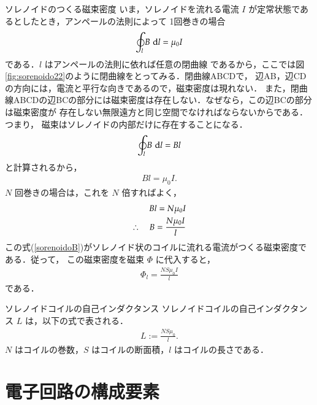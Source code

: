 \begin{memo}{ソレノイドのつくる磁束密度}
        いま，ソレノイドを流れる電流 $I$ が定常状態であるとしたとき，アンペールの法則によって
        1回巻きの場合
        \begin{align}
            \oint_{l}B\,\,\mathrm{d} l =\mu_{0}I
        \end{align}
        である．$l$ はアンペールの法則に依れば任意の閉曲線
        であるから，ここでは図\ref{fig:sorenoido22}のように閉曲線をとってみる．閉曲線ABCDで，
        辺AB，辺CDの方向には，電流と平行な向きであるので，磁束密度は現れない．
        また，閉曲線ABCDの辺BCの部分には磁束密度は存在しない．なぜなら，この辺BCの部分は磁束密度が
        存在しない無限遠方と同じ空間でなければならないからである．つまり，
        磁束はソレノイドの内部だけに存在することになる．
        \begin{equation*}
            \oint_{l}B\,\,\mathrm{d} l=Bl
        \end{equation*}
        と計算されるから，
        \begin{align}
            Bl=\mu_{0} I.
        \end{align}
        $N$ 回巻きの場合は，これを $N$ 倍すればよく，
        \begin{align}\label{sorenoidoB}
            Bl=N\mu_{0} I \\ \notag
            \therefore\quad B=\frac{N\mu_{0} I}{l}
        \end{align}
        この式(\ref{sorenoidoB})がソレノイド状のコイルに流れる電流がつくる磁束密度である．従って，
        この磁束密度を磁束 $\Phi$ に代入すると，
            \begin{align}
                \Phi_{l}=\frac{NS\mu_{0} I}{l}
            \end{align}
        である．
            \begin{myshadebox}{ソレノイドコイルの自己インダクタンス}
                ソレノイドコイルの自己インダクタンス $L$ は，以下の式で表される．
                \begin{align}
                    L := \frac{NS\mu_{0}}{l}.
                \end{align}
                $N$ はコイルの巻数，$S$ はコイルの断面積，$l$ はコイルの長さである．
            \end{myshadebox}
        \end{memo}


    \section{電子回路の構成要素}
